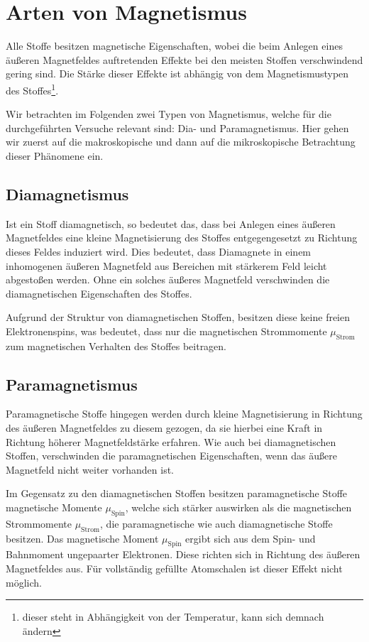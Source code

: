 \documentclass[11pt,a4paper,titlepage, ngerman]{article}
\begin{document}
	\section{Arten von Magnetismus}
				
		Alle Stoffe besitzen magnetische Eigenschaften, wobei die beim Anlegen eines äußeren Magnetfeldes auftretenden Effekte bei den meisten Stoffen verschwindend gering sind. Die \glqq Stärke \grqq dieser Effekte ist abhängig von dem Magnetismustypen des Stoffes\footnote{dieser steht in Abhängigkeit von der Temperatur, kann sich demnach ändern}. 
				
		Wir betrachten im Folgenden zwei Typen von Magnetismus, welche für die durchgeführten Versuche relevant sind: Dia- und Paramagnetismus. Hier gehen wir zuerst auf die makroskopische und dann auf die mikroskopische Betrachtung dieser Phänomene ein.
		
		\subsection{Diamagnetismus}
		
			Ist ein Stoff diamagnetisch, so bedeutet das, dass bei Anlegen eines äußeren Magnetfeldes eine kleine Magnetisierung des Stoffes entgegengesetzt zu Richtung dieses Feldes induziert wird.
			Dies bedeutet, dass Diamagnete in einem inhomogenen äußeren Magnetfeld aus Bereichen mit stärkerem Feld leicht abgestoßen werden. Ohne ein solches äußeres Magnetfeld verschwinden die diamagnetischen Eigenschaften des Stoffes.

			Aufgrund der Struktur von diamagnetischen Stoffen, besitzen diese keine freien Elektronenspins, was bedeutet, dass nur die magnetischen Strommomente $\mu _\text{Strom}$ zum magnetischen Verhalten des Stoffes beitragen.
				
		\subsection{Paramagnetismus}
			
			Paramagnetische Stoffe hingegen werden durch kleine Magnetisierung in Richtung des äußeren Magnetfeldes zu diesem gezogen, da sie hierbei eine Kraft in Richtung höherer Magnetfeldstärke erfahren. 
			Wie auch bei diamagnetischen Stoffen, verschwinden die paramagnetischen Eigenschaften, wenn das äußere Magnetfeld nicht weiter vorhanden ist.
			
			Im Gegensatz zu den diamagnetischen Stoffen besitzen paramagnetische Stoffe magnetische Momente $\mu _\text{Spin}$, welche sich stärker auswirken als die magnetischen Strommomente $\mu _\text{Strom}$, die paramagnetische wie auch diamagnetische Stoffe besitzen.
			Das magnetische	Moment $\mu _\text{Spin}$ ergibt sich aus dem Spin- und Bahnmoment ungepaarter Elektronen. 
			Diese richten sich in Richtung des äußeren Magnetfeldes aus. Für vollständig gefüllte Atomschalen ist dieser Effekt nicht möglich.			
			
\end{document}
